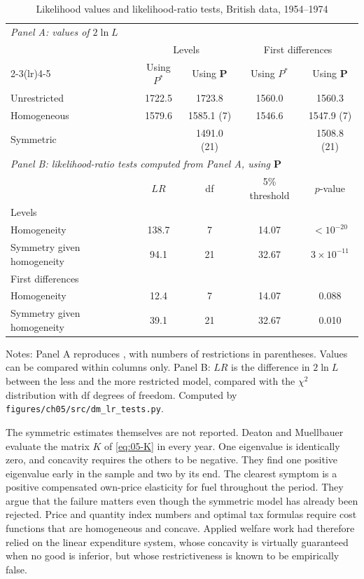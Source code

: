 \begin{table}[htbp]
\centering
\caption{Likelihood values and likelihood-ratio tests, British data, 1954--1974}
\label{tab:05-dm-table4}
\small
\begin{tabular}{lcccc}
\toprule
\multicolumn{5}{l}{\textit{Panel A: values of $2\ln L$}} \\
 & \multicolumn{2}{c}{Levels} & \multicolumn{2}{c}{First differences} \\
\cmidrule(lr){2-3}\cmidrule(lr){4-5}
 & Using $P^*$ & Using $\mathbf{P}$ & Using $P^*$ & Using $\mathbf{P}$ \\
\midrule
Unrestricted & 1722.5 & 1723.8 & 1560.0 & 1560.3 \\
Homogeneous & 1579.6 & 1585.1 (7) & 1546.6 & 1547.9 (7) \\
Symmetric & & 1491.0 (21) & & 1508.8 (21) \\
\midrule
\multicolumn{5}{l}{\textit{Panel B: likelihood-ratio tests computed from Panel A, using $\mathbf{P}$}} \\
 & $LR$ & df & 5\% threshold & $p$-value \\
\midrule
\multicolumn{5}{l}{Levels} \\
\quad Homogeneity & 138.7 & 7 & 14.07 & $< 10^{-20}$ \\
\quad Symmetry given homogeneity & 94.1 & 21 & 32.67 & $3 \times 10^{-11}$ \\
\multicolumn{5}{l}{First differences} \\
\quad Homogeneity & 12.4 & 7 & 14.07 & 0.088 \\
\quad Symmetry given homogeneity & 39.1 & 21 & 32.67 & 0.010 \\
\bottomrule
\end{tabular}

\smallskip
\begin{minipage}{0.94\textwidth}
\footnotesize Notes: Panel A reproduces \citet[Table~4]{DeatonMuellbauer1980a}, with numbers of restrictions in
parentheses. Values can be compared within columns only. Panel B: $LR$ is the difference in $2\ln L$
between the less and the more restricted model, compared with the $\chi^2$ distribution with df degrees of
freedom. Computed by \texttt{figures/ch05/src/dm\_lr\_tests.py}.
\end{minipage}
\end{table}

The symmetric estimates themselves are not reported. Deaton and Muellbauer evaluate the matrix $K$ of
\eqref{eq:05-K} in every year. One eigenvalue is identically zero, and concavity requires the others to be
negative. They find one positive eigenvalue early in the sample and two by its end. The clearest symptom
is a positive compensated own-price elasticity for fuel throughout the period. They argue that the
failure matters even though the symmetric model has already been rejected. Price and quantity index
numbers and optimal tax formulas require cost functions that are homogeneous and concave. Applied
welfare work had therefore relied on the linear expenditure system, whose concavity is virtually
guaranteed when no good is inferior, but whose restrictiveness is known to be empirically false.

